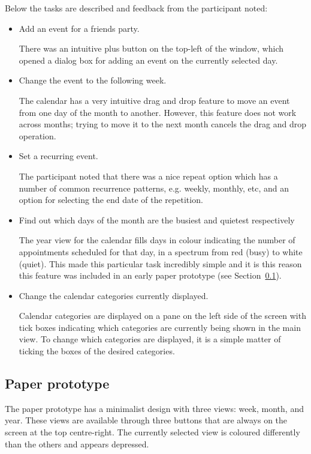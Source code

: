 \documentclass{article}
\begin{document}
Below the tasks are described and feedback from the participant noted:

\begin{itemize}
\item Add an event for a friends party.

There was an intuitive plus button on the top-left of the window, which
opened a dialog box for adding an event on the currently selected day.

\item Change the event to the following week.

The calendar has a very intuitive drag and drop feature to move an
event from one day of the month to another. However, this feature does
not work across months; trying to move it to the next month cancels
the drag and drop operation.

\item Set a recurring event.

The participant noted that there was a nice repeat option which has
a number of common recurrence patterns, e.g. weekly, monthly, etc, and
an option for selecting the end date of the repetition.

\item Find out which days of the month are the busiest and quietest
respectively

The year view for the calendar fills days in colour indicating the
number of appointments scheduled for that day, in a spectrum from
red (busy) to white (quiet). This made this particular task incredibly
simple and it is this reason this feature was included in an early
paper prototype (see Section~\ref{sec:osxpp}).

\item Change the calendar categories currently displayed.

Calendar categories are displayed on a pane on the left side of the
screen with tick boxes indicating which categories are currently being
shown in the main view. To change which categories are displayed, it is
a simple matter of ticking the boxes of the desired categories.

\end{itemize}

\subsection{Paper prototype}
\label{sec:osxpp}

The paper prototype has a minimalist design with three views: week,
month, and year. These views are available through three buttons that
are always on the screen at the top centre-right. The currently selected
view is coloured differently than the others and appears depressed.
\end{document}

